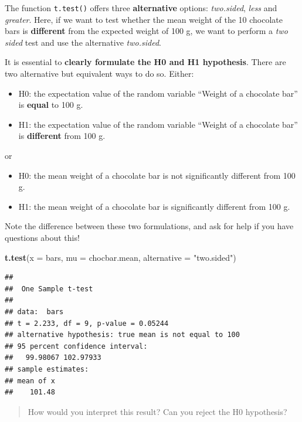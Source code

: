 \documentclass[
]{book}
\newenvironment{Shaded}{\begin{snugshade}}{\end{snugshade}}
\newcommand{\AttributeTok}[1]{\textcolor[rgb]{0.13,0.29,0.53}{#1}}
\newcommand{\FunctionTok}[1]{\textcolor[rgb]{0.13,0.29,0.53}{\textbf{#1}}}
\newcommand{\NormalTok}[1]{#1}
\newcommand{\StringTok}[1]{\textcolor[rgb]{0.31,0.60,0.02}{#1}}
\providecommand{\tightlist}{%
  \setlength{\itemsep}{0pt}\setlength{\parskip}{0pt}}
\begin{document}
The function \texttt{t.test()} offers three \textbf{alternative} options: \emph{two.sided}, \emph{less} and \emph{greater}.
Here, if we want to test whether the mean weight of the 10 chocolate bars is \textbf{different} from the expected weight of 100 g, we want to perform a \emph{two sided} test and use the alternative \emph{two.sided}.

It is essential to \textbf{clearly formulate the H0 and H1 hypothesis}.
There are two alternative but equivalent ways to do so.
Either:

\begin{itemize}
\tightlist
\item
  H0: the expectation value of the random variable ``Weight of a chocolate bar'' is \textbf{equal} to 100 g.\\
\item
  H1: the expectation value of the random variable ``Weight of a chocolate bar'' is \textbf{different} from 100 g.
\end{itemize}

or

\begin{itemize}
\tightlist
\item
  H0: the mean weight of a chocolate bar is not significantly different from 100 g.\\
\item
  H1: the mean weight of a chocolate bar is significantly different from 100 g.
\end{itemize}

Note the difference between these two formulations, and ask for help if you have questions about this!

\begin{Shaded}
\begin{Highlighting}[]
\FunctionTok{t.test}\NormalTok{(}\AttributeTok{x =}\NormalTok{ bars, }\AttributeTok{mu =}\NormalTok{ chocbar.mean, }\AttributeTok{alternative =} \StringTok{"two.sided"}\NormalTok{)}
\end{Highlighting}
\end{Shaded}

\begin{verbatim}
## 
##  One Sample t-test
## 
## data:  bars
## t = 2.233, df = 9, p-value = 0.05244
## alternative hypothesis: true mean is not equal to 100
## 95 percent confidence interval:
##   99.98067 102.97933
## sample estimates:
## mean of x 
##    101.48
\end{verbatim}

\begin{quote}
How would you interpret this result?
Can you reject the H0 hypothesis?
\end{quote}
\end{document}
